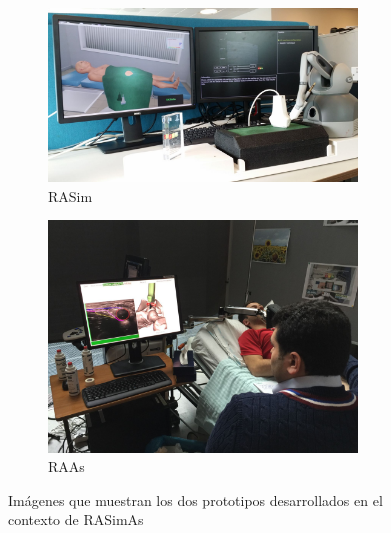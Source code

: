 \begin{figure}[ht]
  \centering
  \begin{subfigure}[b]{0.5\linewidth}
    \centering\includegraphics[width=0.9\textwidth]{IMG/sim3.jpg}
    \caption{\ac{RASim} \label{subfig:rasim}}
  \end{subfigure}%
  \begin{subfigure}[b]{0.5\linewidth}
    \centering\includegraphics[width=0.9\textwidth]{IMG/raas.JPG}
    \caption{\ac{RAAs} \label{subfig:raas}}
  \end{subfigure}
  \caption{Imágenes que muestran los dos prototipos desarrollados en el contexto de \ac{RASimAs}}
\end{figure}


